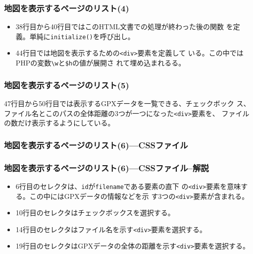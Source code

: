 \documentclass[dvipsk]{beamer}
\begin{document}
\begin{frame}[containsverbatim]
\frametitle{地図を表示するページのリスト(4)}
\begin{itemize}
 \item 38行目から40行目ではこのHTML文書での処理が終わった後の関数
	      を定義。単純に\texttt{initialize()}を呼び出し。
 \item 44行目では地図を表示するための\texttt{<div>}要素を定義して
	      いる。この中ではPHPの変数\verb+\w+と\verb+$h+の値が展開さ
	      れて埋め込まれるる。
\end{itemize}
\end{frame}
\begin{frame}[containsverbatim]
\frametitle{地図を表示するページのリスト(5)}
{\footnotesize
{}
}
47行目から50行目では表示するGPXデータを一覧できる、チェックボック
       ス、ファイル名とこのパスの全体距離の3つが一つになった\texttt{<div>}要素を、
       ファイルの数だけ表示するようにしている。
\end{frame}
\begin{frame}[containsverbatim]
\frametitle{地図を表示するページのリスト(6)---CSSファイル}
 {\tiny
{}
 }
\end{frame}
\begin{frame}[containsverbatim]
\frametitle{地図を表示するページのリスト(6)---CSSファイル--解説}
\begin{itemize}
 \item 6行目のセレクタは、\texttt{id}が\texttt{filename}である要素の直下
       の\texttt{<div>}要素を意味する。この中にはGPXデータの情報などを示
       す3つの\texttt{<div>}要素が含まれる。
 \item 10行目のセレクタはチェックボックスを選択する。
 \item 14行目のセレクタはファイル名を示す\texttt{<div>}要素を選択する。
 \item 19行目のセレクタはGPXデータの全体の距離を示す\texttt{<div>}要素を選択する。
\end{itemize}
\end{frame}
\end{document}
